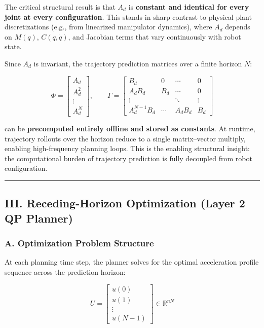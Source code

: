 The critical structural result is that \(A_d\) is \textbf{constant and
identical for every joint at every configuration}. This stands in sharp
contrast to physical plant discretizations (e.g., from linearized
manipulator dynamics), where \(A_d\) depends on \(M(q)\),
\(C(q,\dot{q})\), and Jacobian terms that vary continuously with robot
state.

Since \(A_d\) is invariant, the trajectory prediction matrices over a
finite horizon \(N\):

\[\Phi = \begin{bmatrix} A_d \\ A_d^2 \\ \vdots \\ A_d^N \end{bmatrix}, \qquad \Gamma = \begin{bmatrix} B_d & 0 & \cdots & 0 \\ A_d B_d & B_d & \cdots & 0 \\ \vdots & & \ddots & \vdots \\ A_d^{N-1} B_d & \cdots & A_d B_d & B_d \end{bmatrix}\]

can be \textbf{precomputed entirely offline and stored as constants}. At
runtime, trajectory rollouts over the horizon reduce to a single
matrix--vector multiply, enabling high-frequency planning loops. This is
the enabling structural insight: the computational burden of trajectory
prediction is fully decoupled from robot configuration.

\begin{center}\rule{0.5\linewidth}{0.5pt}\end{center}

\subsection{III. Receding-Horizon Optimization (Layer 2 QP
Planner)}\label{iii.-receding-horizon-optimization-layer-2-qp-planner}

\subsubsection{A. Optimization Problem
Structure}\label{a.-optimization-problem-structure}

At each planning time step, the planner solves for the optimal
acceleration profile sequence across the prediction horizon:

\[U = \begin{bmatrix} u(0) \\ u(1) \\ \vdots \\ u(N-1) \end{bmatrix} \in \mathbb{R}^{nN}\]

